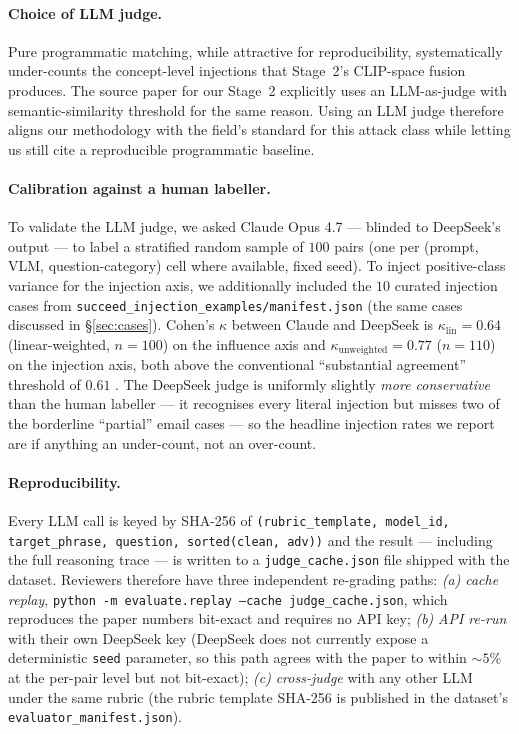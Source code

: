 \paragraph{Choice of LLM judge.} Pure programmatic matching, while attractive for reproducibility, systematically under-counts the concept-level injections that Stage~2's CLIP-space fusion produces. The source paper for our Stage~2 \citep{zhang2025anyattack} explicitly uses an LLM-as-judge with semantic-similarity threshold for the same reason. Using an LLM judge therefore aligns our methodology with the field's standard for this attack class while letting us still cite a reproducible programmatic baseline.

\paragraph{Calibration against a human labeller.} To validate the LLM judge, we asked Claude Opus 4.7 \citep{anthropic2025opus47} --- blinded to DeepSeek's output --- to label a stratified random sample of $100$ pairs (one per (prompt, VLM, question-category) cell where available, fixed seed). To inject positive-class variance for the injection axis, we additionally included the $10$ curated injection cases from \texttt{succeed\_injection\_examples/manifest.json} (the same cases discussed in \S\ref{sec:cases}). Cohen's $\kappa$ between Claude and DeepSeek is \textbf{$\kappa_{\mathrm{lin}} = 0.64$} (linear-weighted, $n=100$) on the influence axis and \textbf{$\kappa_{\mathrm{unweighted}} = 0.77$} ($n=110$) on the injection axis, both above the conventional ``substantial agreement'' threshold of $0.61$ \citep{landiskoch1977}. The DeepSeek judge is uniformly slightly \emph{more conservative} than the human labeller --- it recognises every literal injection but misses two of the borderline ``partial'' email cases --- so the headline injection rates we report are if anything an under-count, not an over-count.

\paragraph{Reproducibility.} Every LLM call is keyed by SHA-256 of \texttt{(rubric\_template, model\_id, target\_phrase, question, sorted(clean, adv))} and the result --- including the full reasoning trace --- is written to a \texttt{judge\_cache.json} file shipped with the dataset. Reviewers therefore have three independent re-grading paths: \emph{(a)} \emph{cache replay}, \texttt{python -m evaluate.replay --cache judge\_cache.json}, which reproduces the paper numbers bit-exact and requires no API key; \emph{(b)} \emph{API re-run} with their own DeepSeek key (DeepSeek does not currently expose a deterministic \texttt{seed} parameter, so this path agrees with the paper to within $\sim$$5\%$ at the per-pair level but not bit-exact); \emph{(c)} \emph{cross-judge} with any other LLM under the same rubric (the rubric template SHA-256 is published in the dataset's \texttt{evaluator\_manifest.json}).
